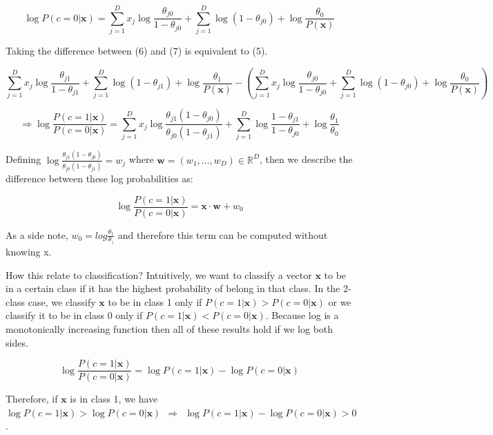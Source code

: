 \begin{equation}
\log P(c = 0 | \mathbf{x}) = \sum_{j=1}^D x_j \log \frac{ \theta_{j0}}{1 - \theta_{j0}} + \sum_{j=1}^D \log(1 - \theta_{j0}) +  \log \frac{\theta_0}{P(\mathbf{x})} 
\end{equation}

Taking the difference between (6) and (7) is equivalent to (5). 

$$
\sum_{j=1}^D x_j \log \frac{ \theta_{j1}}{1 - \theta_{j1}} + 
\sum_{j=1}^D \log(1 - \theta_{j1}) +  \log \frac{\theta_1}{P(\mathbf{x})} - \left( \sum_{j=1}^D x_j \log \frac{ \theta_{j0}}{1 - \theta_{j0}} + \sum_{j=1}^D \log(1 - \theta_{j0}) +  \log \frac{\theta_0}{P(\mathbf{x})} \right)
$$

$$
\Rightarrow \log \frac{  P( c = 1 | \mathbf{x})}{P( c = 0 | \mathbf{x})} = 
\sum_{j=1}^D x_j \log \frac{ \theta_{j1} ( 1 - \theta_{j0}) }{ \theta_{j0}  (1 - \theta_{j1} ) } + 
\sum_{j=1}^D \log \frac{ 1 - \theta_{j1} }{ 1 - \theta_{j0}  } +
 \log \frac{\theta_1}{\theta_0}
$$

Defining $ \log \frac{ \theta_{j1} ( 1 - \theta_{j0}) }{ \theta_{j0}  (1 - \theta_{j1} ) } = w_j $ where $\mathbf{w} = ( w_1, \dots, w_D) \in \mathbb{R}^D$, then we describe the difference between these log probabilities as:  

\begin{equation}
\log \frac{  P( c = 1 | \mathbf{x})}{P( c = 0 | \mathbf{x})} = 
\mathbf{x} \cdot \mathbf{w} + w_0
\end{equation}

As a side note, $w_0 = log \frac{\theta_1}{\theta_)}$ and therefore this term can be computed without knowing x. 

How this relate to classification?  Intuitively, we want to classify a vector $\mathbf{x}$ to be in a certain class if it has the highest probability of belong in that class.  In the 2-class case, we classify $\mathbf{x}$ to be in class 1 only if $P( c = 1| \mathbf{x}) > P( c = 0 | \mathbf{x}) $  or we classify it to be in class 0 only if $P( c = 1| \mathbf{x}) < P( c = 0 | \mathbf{x}) $. Because log is a monotonically increasing function then all of these results hold if we log both sides.  


$$
\log \frac{  P( c = 1 | \mathbf{x})}{P( c = 0 | \mathbf{x})} = \log P( c = 1 | \mathbf{x}) - \log P( c = 0 | \mathbf{x})
$$

Therefore, if $\mathbf{x}$ is in class 1, we have $ \log P( c = 1| \mathbf{x}) > \log P( c = 0 | \mathbf{x})  ~~ \Rightarrow ~~ \log P( c = 1| \mathbf{x}) - \log P( c = 0 | \mathbf{x}) > 0 $.  

